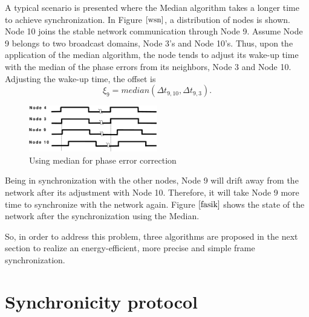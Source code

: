 \documentclass[journal]{IEEEtran}
\begin{document}
\par A typical scenario is presented where the Median algorithm takes a longer time to achieve synchronization. In Figure $\ref{wsn}$, a distribution of nodes is shown. Node 10 joins  the stable network communication through Node 9. Assume Node 9 belongs to two broadcast domains, Node 3's and Node 10's. Thus, upon the application of the median algorithm, the node tends to adjust its wake-up time with the median of the phase errors from its neighbors, Node 3 and Node 10. Adjusting the wake-up time, the offset is
\begin{equation}
\xi_9 = median(\Delta t_{9,10} ,\Delta t_{9,3}).
\end{equation}
\begin{figure}
\centering
\includegraphics[width= 0.5\textwidth]{offsetpic}
\caption{Using median for phase error correction} \label{fasik}
\end{figure}
Being in synchronization with the other nodes, Node 9 will drift away from the network after its adjustment with Node 10. Therefore, it will take Node 9 more time to synchronize with the network again. Figure $\ref{fasik}$ shows the state of the network after the synchronization using the Median.
\par So, in order to address this problem, three algorithms are proposed in the next section to realize an energy-efficient, more precise and simple frame synchronization.
\section{\textbf{Synchronicity protocol}}
\end{document}
